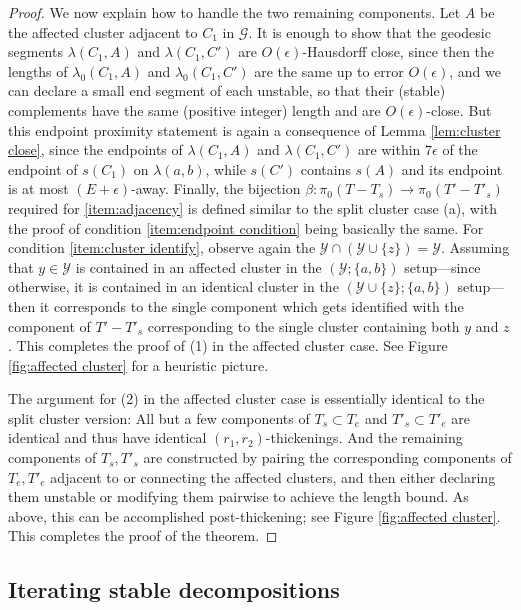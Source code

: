 \documentclass{amsart}
\theoremstyle{definition}
\theoremstyle{remark}
\theoremstyle{definition}
\newcommand{\calG}{\mathcal{G}}
\newcommand{\calY}{\mathcal{Y}}
\begin{document}
\begin{proof}
We now explain how to handle the two remaining components.  Let $A$ be the affected cluster adjacent to $C_1$ in $\calG$.  It is enough to show that the geodesic segments $\lambda(C_1,A)$ and $\lambda(C_1,C')$ are $O(\epsilon)$-Hausdorff close, since then the lengths of $\lambda_0(C_1,A)$ and $\lambda_0(C_1,C')$ are the same up to error $O(\epsilon)$, and we can declare a small end segment of each unstable, so that their (stable) complements have the same (positive integer) length and are $O(\epsilon)$-close.  But this endpoint proximity statement is again a consequence of Lemma \ref{lem:cluster close}, since the endpoints of $\lambda(C_1,A)$ and $\lambda(C_1,C')$ are within $7\epsilon$ of the endpoint of $s(C_1)$ on $\lambda(a,b)$, while $s(C')$ contains $s(A)$ and its endpoint is at most $(E+\epsilon)$-away.  Finally, the bijection $\beta:\pi_0(T-T_s) \to \pi_0(T'-T'_s)$ required for \eqref{item:adjacency} is defined similar to the split cluster case (a), with the proof of condition \eqref{item:endpoint condition} being basically the same.  For condition \eqref{item:cluster identify}, observe again the $\calY \cap (\calY \cup \{z\}) = \calY$.  Assuming that $y \in \calY$ is contained in an affected cluster in the $(\calY; \{a,b\})$ setup---since otherwise, it is contained in an identical cluster in the $(\calY \cup \{z\};\{a,b\})$ setup---then it corresponds to the single component which gets identified with the component of $T'- T'_s$ corresponding to the single cluster containing both $y$ and $z$.  This completes the proof of (1) in the affected cluster case.  See Figure \ref{fig:affected cluster} for a heuristic picture.

The argument for (2) in the affected cluster case is essentially identical to the split cluster version: All but a few components of $T_s \subset T_e$ and $T'_s \subset T'_e$ are identical and thus have identical $(r_1,r_2)$-thickenings.  And the remaining components of $T_s, T'_s$ are constructed by pairing the corresponding components of $T_e, T'_e$ adjacent to or connecting the affected clusters, and then either declaring them unstable or modifying them pairwise to achieve the length bound.  As above, this can be accomplished post-thickening; see Figure \ref{fig:affected cluster}.  This completes the proof of the theorem.

\end{proof}

\subsection{Iterating stable decompositions}
\end{document}
